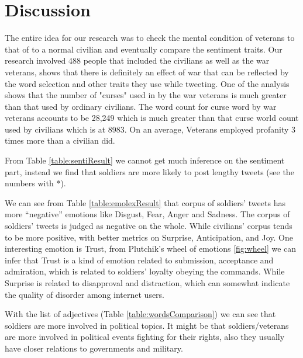 \section{Discussion}

The entire idea for our research was to check the mental condition of veterans to that of to a normal civilian and eventually compare the sentiment traits. Our research involved 488 people that included the civilians as well as the war veterans, shows that there is definitely an effect of war that can be reflected by the word selection and other traits they use while tweeting. One of the analysis shows that the number of "curses" used in by the war veterans is much greater than that used by ordinary civilians. The word count for curse word by war veterans accounts to be 28,249 which is much greater than that curse world count used by civilians which is at 8983. On an average, Veterans employed profanity 3 times more than a civilian did.

From Table \ref{table:sentiResult} we cannot get much inference on the sentiment part, instead we find that soldiers are more likely to post lengthy tweets (see the numbers with *).

We can see from Table \ref{table:emolexResult} that corpus of soldiers' tweets has more \enquote{negative} emotions like Disgust, Fear, Anger and Sadness. The corpus of soldiers' tweets is judged as negative on the whole. While civilians' corpus tends to be more positive, with better metrics on Surprise, Anticipation, and Joy. One interesting emotion is Trust, from Plutchik's wheel of emotions \ref{fig:wheel} we can infer that Trust is a kind of emotion related to submission, acceptance and admiration, which is related to soldiers' loyalty obeying the commands. While Surprise is related to disapproval and distraction, which can somewhat indicate the quality of disorder among internet users.

With the list of adjectives (Table \ref{table:wordsComparison}) we can see that soldiers are more involved in political topics. It might be that soldiers/veterans are more involved in political events fighting for their rights, also they usually have closer relations to governments and military.
